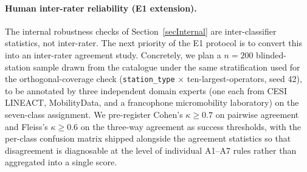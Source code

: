 \documentclass[11pt,a4paper]{article}
\begin{document}
\paragraph{Human inter-rater reliability (E1 extension).}
The internal robustness checks of Section~\ref{secInternal} are
inter-classifier statistics, not inter-rater. The next priority of
the E1 protocol is to convert this into an inter-rater agreement
study. Concretely, we plan a $n = 200$ blinded-station sample
drawn from the catalogue under the same stratification used for
the orthogonal-coverage check (\texttt{station\_type} $\times$
ten-largest-operators, seed 42), to be annotated by three
independent domain experts (one each from CESI LINEACT,
MobilityData, and a francophone micromobility laboratory) on the
seven-class assignment. We pre-register Cohen's $\kappa \geq 0.7$
on pairwise agreement and Fleiss's $\kappa \geq 0.6$ on the
three-way agreement as success thresholds, with the per-class
confusion matrix shipped alongside the agreement statistics so
that disagreement is diagnosable at the level of individual A1--A7
rules rather than aggregated into a single score.
\end{document}
